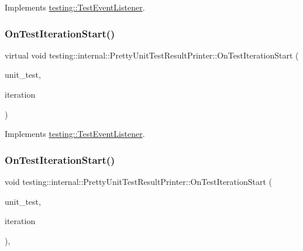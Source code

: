 Implements \mbox{\hyperlink{classtesting_1_1_test_event_listener_a550fdb3e55726e4cefa09f5697941425}{testing\+::\+Test\+Event\+Listener}}.

\mbox{\label{classtesting_1_1internal_1_1_pretty_unit_test_result_printer_ae1fb592555956930ad56e85727a86e7a}} 
\subsubsection{\texorpdfstring{OnTestIterationStart()}{OnTestIterationStart()}\hspace{0.1cm}{\footnotesize\ttfamily [1/3]}}
{\footnotesize\ttfamily virtual void testing\+::internal\+::\+Pretty\+Unit\+Test\+Result\+Printer\+::\+On\+Test\+Iteration\+Start (\begin{DoxyParamCaption}\item[{const \mbox{\hyperlink{classtesting_1_1_unit_test}{Unit\+Test}} \&}]{unit\+\_\+test,  }\item[{int}]{iteration }\end{DoxyParamCaption})\hspace{0.3cm}{\ttfamily [virtual]}}



Implements \mbox{\hyperlink{classtesting_1_1_test_event_listener_a60cc09b7907cb329d152eb5e7133bdeb}{testing\+::\+Test\+Event\+Listener}}.

\mbox{\label{classtesting_1_1internal_1_1_pretty_unit_test_result_printer_a0e7e8909452ef92aaf02f4cffde5ee28}} 
\subsubsection{\texorpdfstring{OnTestIterationStart()}{OnTestIterationStart()}\hspace{0.1cm}{\footnotesize\ttfamily [2/3]}}
{\footnotesize\ttfamily void testing\+::internal\+::\+Pretty\+Unit\+Test\+Result\+Printer\+::\+On\+Test\+Iteration\+Start (\begin{DoxyParamCaption}\item[{const \mbox{\hyperlink{classtesting_1_1_unit_test}{Unit\+Test}} \&}]{unit\+\_\+test,  }\item[{int}]{iteration }\end{DoxyParamCaption})\hspace{0.3cm}{\ttfamily [override]}, {\ttfamily [virtual]}}



